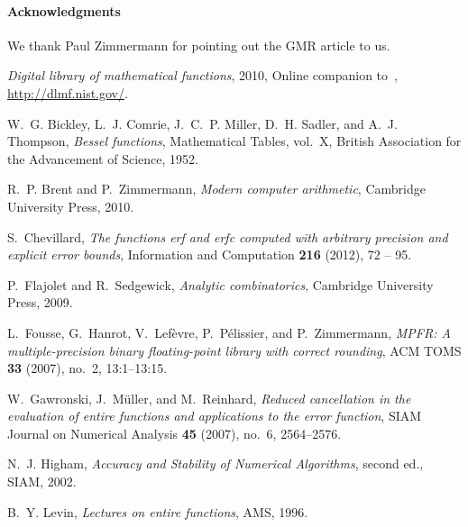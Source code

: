 \documentclass[10pt, conference]{IEEEtran}
\begin{document}
\paragraph*{Acknowledgments}

We thank Paul Zimmermann for pointing out the GMR article to us.




\providecommand{\bysame}{\leavevmode\hbox to3em{\hrulefill}\thinspace}
\providecommand{\MR}{\relax\ifhmode\unskip\space\fi MR }
\providecommand{\MRhref}[2]{\href{http://www.ams.org/mathscinet-getitem?mr=#1}{#2}
}
\providecommand{\href}[2]{#2}
\begin{thebibliography}{10}

\emph{Digital library of mathematical functions}, 2010, Online companion
  to~\cite{OlverLozierBoisvertClark2010}, \url{http://dlmf.nist.gov/}.

W.~G. Bickley, L.~J. Comrie, J.~C.~P. Miller, D.~H. Sadler, and A.~J. Thompson,
  \emph{Bessel functions}, Mathematical Tables, vol.~X, British Association for
  the Advancement of Science, 1952.

R.~P. Brent and P.~Zimmermann, \emph{Modern computer arithmetic}, Cambridge
  University Press, 2010.

S.~Chevillard, \emph{The functions erf and erfc computed with arbitrary
  precision and explicit error bounds}, Information and Computation
  \textbf{216} (2012), 72 -- 95.

P.~Flajolet and R.~Sedgewick, \emph{Analytic combinatorics}, Cambridge
  University Press, 2009.

L.~Fousse, G.~Hanrot, V.~Lef\`evre, P.~P\'elissier, and P.~Zimmermann,
  \emph{{MPFR}: A multiple-precision binary floating-point library with correct
  rounding}, {ACM TOMS} \textbf{33} (2007), no.~2, 13:1--13:15.

W.~Gawronski, J.~Müller, and M.~Reinhard, \emph{Reduced cancellation in the
  evaluation of entire functions and applications to the error function}, SIAM
  Journal on Numerical Analysis \textbf{45} (2007), no.~6, 2564--2576.

N.~J. Higham, \emph{{Accuracy and Stability of Numerical Algorithms}}, second
  ed., SIAM, 2002.

B.~Y. Levin, \emph{Lectures on entire functions}, AMS, 1996.


\end{thebibliography}
\end{document}

